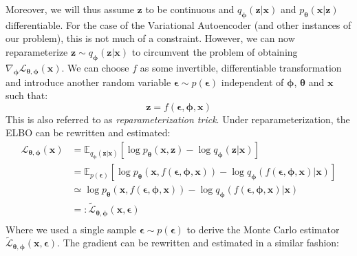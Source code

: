 \documentclass[12pt]{report}
\theoremstyle{definition}
\begin{document}
Moreover, we will thus assume $\mathbf{z}$ to be continuous and $q_{\pmb{\phi}}(\mathbf{z}|\mathbf{x})$ and $p_{\pmb{\theta}}(\mathbf{x}|\mathbf{z})$ differentiable. For the case of the Variational Autoencoder (and other instances of our problem), this is not much of a constraint. However, we can now reparameterize $\mathbf{z} \sim q_{\pmb{\phi}}(\mathbf{z}|\mathbf{x})$ to circumvent the problem of obtaining $\nabla_{\pmb{\phi}}\mathcal{L}_{\pmb{\theta}, \pmb{\phi}}(\mathbf{x})$. We can choose $f$ as some invertible, differentiable transformation and introduce another random variable $\pmb{\epsilon} \sim p(\pmb{\epsilon})$ independent of $\pmb{\phi}$, $\pmb{\theta}$ and $\mathbf{x}$ such that:
\begin{equation}
\mathbf{z} = f(\pmb{\epsilon}, \pmb{\phi}, \mathbf{x})
\end{equation}
This is also referred to as \emph{reparameterization trick}. Under reparameterization, the ELBO can be rewritten and estimated:
\begin{equation}
\begin{split}
\mathcal{L}_{\pmb{\theta}, \pmb{\phi}}(\mathbf{x})
& = \mathbb{E}_{q_{\pmb{\phi}}(\mathbf{z}|\mathbf{x})}\left[ \log p_{\pmb{\theta}}(\mathbf{x}, \mathbf{z}) - \log q_{\pmb{\phi}}(\mathbf{z}|\mathbf{x})\right]\\
& = \mathbb{E}_{p(\pmb{\epsilon})}\left[ \log p_{\pmb{\theta}}(\mathbf{x}, f(\pmb{\epsilon}, \pmb{\phi}, \mathbf{x})) - \log q_{\pmb{\phi}}(f(\pmb{\epsilon}, \pmb{\phi}, \mathbf{x})|\mathbf{x}) \right]	\\
& \simeq \log p_{\pmb{\theta}}(\mathbf{x}, f(\pmb{\epsilon}, \pmb{\phi}, \mathbf{x})) - \log q_{\pmb{\phi}}(f(\pmb{\epsilon}, \pmb{\phi}, \mathbf{x})|\mathbf{x})\\
& =: \tilde{\mathcal{L}}_{\pmb{\theta}, \pmb{\phi}}(\mathbf{x}, \pmb{\epsilon})\\
\end{split}
\end{equation}
Where we used a single sample $\pmb{\epsilon}\sim p(\pmb{\epsilon})$ to derive the Monte Carlo estimator $\tilde{\mathcal{L}}_{\pmb{\theta}, \pmb{\phi}}(\mathbf{x}, \pmb{\epsilon})$. The gradient can be rewritten and estimated in a similar fashion:
\end{document}
